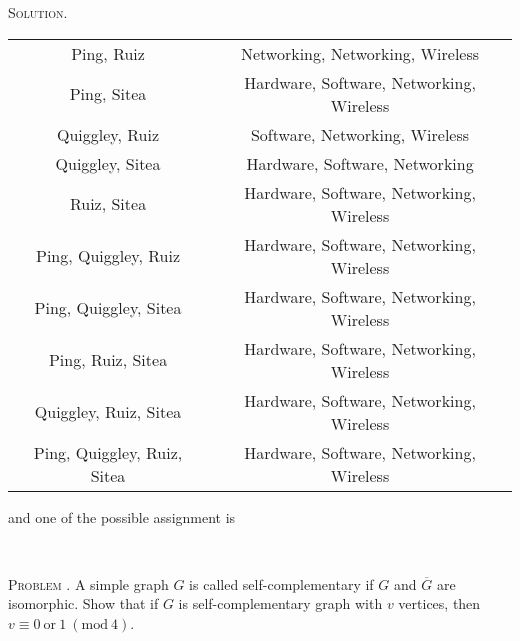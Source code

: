 \documentclass[12pt, a4paper, oneside]{article}
\newcounter{problemname}
\newenvironment{problem}{\stepcounter{problemname}\par\noindent\textsc{Problem \arabic{problemname}. }}{\\\par}
\newenvironment{solution}{\par\noindent\textsc{Solution. }}{\\\par}
\begin{document}
\begin{solution}
\begin{table}[!htbp]
\begin{tabular}{cc}
            Ping, Ruiz & Networking, Networking, Wireless \\
            Ping, Sitea & Hardware, Software, Networking, Wireless \\
            Quiggley, Ruiz & Software, Networking, Wireless \\
            Quiggley, Sitea & Hardware, Software, Networking\\
            Ruiz, Sitea & Hardware, Software, Networking, Wireless \\
            Ping, Quiggley, Ruiz & Hardware, Software, Networking, Wireless \\
            Ping, Quiggley, Sitea & Hardware, Software, Networking, Wireless \\
            Ping, Ruiz, Sitea & Hardware, Software, Networking, Wireless \\
            Quiggley, Ruiz, Sitea & Hardware, Software, Networking, Wireless \\
            Ping, Quiggley, Ruiz, Sitea & Hardware, Software, Networking, Wireless \\
            \bottomrule
        \end{tabular}
    \end{table}
    \newline and one of the possible assignment is
    \begin{figure*}[!htbp]
        \centering
    \end{figure*}
\end{solution}

\begin{problem}
    A simple graph $G$ is called self-complementary if $G$ and $\overline{G}$ are isomorphic.
    Show that if $G$ is self-complementary graph with $v$ vertices, then $v\equiv 0\ \text{or}\ 1\ (\text{mod}\ 4)$.
\end{problem}
\end{document}
